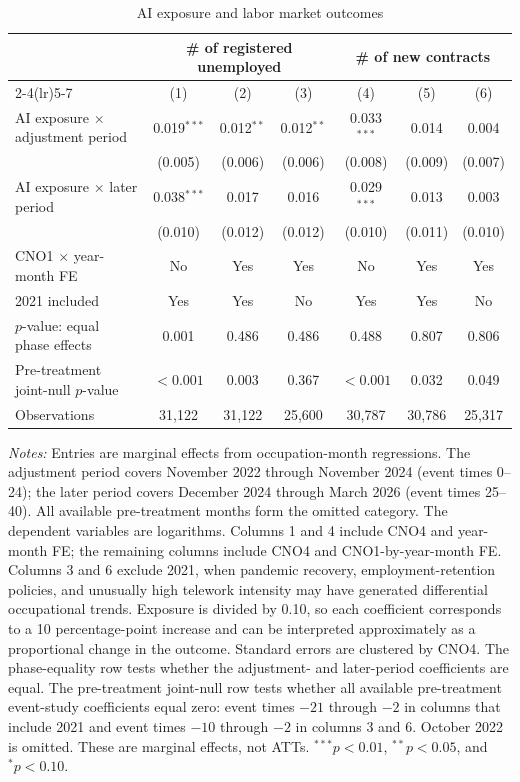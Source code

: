 \begin{table}[!t]
\centering
\caption{AI exposure and labor market outcomes}
\label{tab:v1_main_effects}
\begin{threeparttable}
\scriptsize
\setlength{\tabcolsep}{3.5pt}
\begin{tabular}{lcccccc}
\toprule
& \multicolumn{3}{c}{\# of registered unemployed} & \multicolumn{3}{c}{\# of new contracts} \\
\cmidrule(lr){2-4}\cmidrule(lr){5-7}
& (1) & (2) & (3) & (4) & (5) & (6) \\
\midrule
AI exposure $\times$ adjustment period & 0.019$^{***}$ & 0.012$^{**}$ & 0.012$^{**}$ & 0.033$^{***}$ & 0.014 & 0.004 \\
 & (0.005) & (0.006) & (0.006) & (0.008) & (0.009) & (0.007) \\
AI exposure $\times$ later period & 0.038$^{***}$ & 0.017 & 0.016 & 0.029$^{***}$ & 0.013 & 0.003 \\
 & (0.010) & (0.012) & (0.012) & (0.010) & (0.011) & (0.010) \\
\midrule
CNO1 $\times$ year-month FE & No & Yes & Yes & No & Yes & Yes \\
2021 included & Yes & Yes & No & Yes & Yes & No \\
$p$-value: equal phase effects & 0.001 & 0.486 & 0.486 & 0.488 & 0.807 & 0.806 \\
Pre-treatment joint-null $p$-value & $<0.001$ & 0.003 & 0.367 & $<0.001$ & 0.032 & 0.049 \\
Observations & 31,122 & 31,122 & 25,600 & 30,787 & 30,786 & 25,317 \\
\bottomrule
\end{tabular}
\begin{tablenotes}[flushleft]
\footnotesize
\item \emph{Notes:} Entries are marginal effects from occupation-month regressions. The adjustment period covers November 2022 through November 2024 (event times 0--24); the later period covers December 2024 through March 2026 (event times 25--40). All available pre-treatment months form the omitted category. The dependent variables are logarithms. Columns 1 and 4 include CNO4 and year-month FE; the remaining columns include CNO4 and CNO1-by-year-month FE. Columns 3 and 6 exclude 2021, when pandemic recovery, employment-retention policies, and unusually high telework intensity may have generated differential occupational trends. Exposure is divided by 0.10, so each coefficient corresponds to a 10 percentage-point increase and can be interpreted approximately as a proportional change in the outcome. Standard errors are clustered by CNO4. The phase-equality row tests whether the adjustment- and later-period coefficients are equal. The pre-treatment joint-null row tests whether all available pre-treatment event-study coefficients equal zero: event times $-21$ through $-2$ in columns that include 2021 and event times $-10$ through $-2$ in columns 3 and 6. October 2022 is omitted. These are marginal effects, not ATTs. $^{***}p<0.01$, $^{**}p<0.05$, and $^{*}p<0.10$.
\end{tablenotes}
\end{threeparttable}
\end{table}

